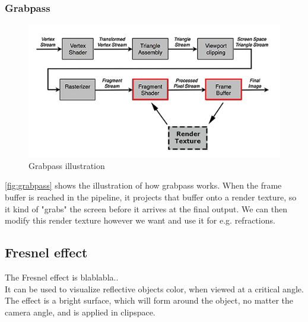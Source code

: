 \documentclass{article}
\begin{document}
\subsubsection{Grabpass}
\label{sec:grabpass}
\begin{figure}[H]
	\centering
	\includegraphics[width=\textwidth]{img/grabpass}
	\caption{Grabpass illustration}
	\label{fig:grabpass}
\end{figure}
\autoref{fig:grabpass} shows the illustration of how grabpass works. When the frame buffer is reached in the pipeline, it projects that buffer onto a render texture, so it kind of "grabs" the screen before it arrives at the final output. We can then modify this render texture however we want and use it for e.g. refractions.

\subsection{Fresnel effect}
\label{sec:fresnel_effect}
The Fresnel effect is blablabla..\\It can be used to visualize reflective objects color, when viewed at a critical angle. The effect is a bright surface, which will form around the object, no matter the camera angle, and is applied in clipspace.



\end{document}
